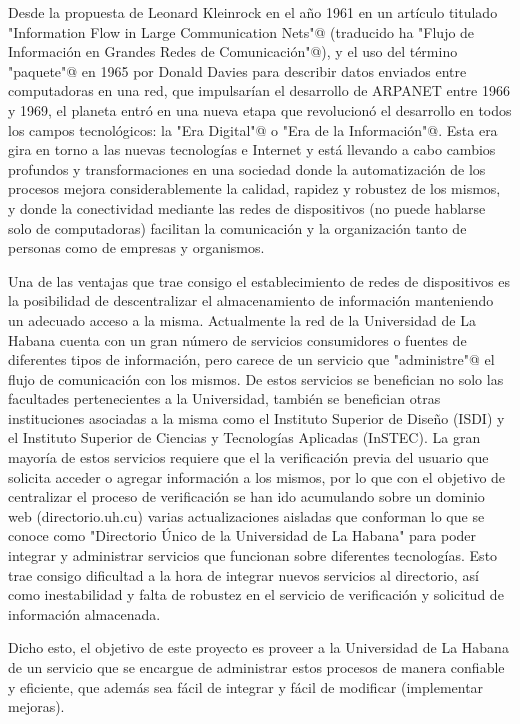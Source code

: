 \begin{introduction}
Desde la propuesta de Leonard Kleinrock en el año 1961 en un artículo titulado \verb@"Information Flow in Large Communication Nets"@ (traducido ha
\verb@"Flujo de Información en Grandes Redes de Comunicación"@), y el uso del término
\verb@"paquete"@ en 1965 por Donald Davies para describir datos enviados entre computadoras
en una red, que impulsarían el desarrollo de ARPANET entre 1966 y 1969, el planeta
entró en una nueva etapa que revolucionó el desarrollo en todos los campos 
tecnológicos: la \verb@"Era Digital"@ o \verb@"Era de la Información"@. Esta era gira
en torno a las nuevas tecnologías e Internet y está llevando a cabo cambios profundos y
transformaciones en una sociedad donde la automatización de los procesos mejora
considerablemente la calidad, rapidez y robustez de los mismos, y donde la conectividad
mediante las redes de dispositivos (no puede hablarse solo de computadoras) facilitan 
la comunicación y la organización tanto de personas como de empresas y organismos. 

Una de las ventajas que trae consigo el establecimiento de redes de dispositivos es
la posibilidad de descentralizar el almacenamiento de información manteniendo un adecuado acceso a la misma. Actualmente la red de la Universidad de La Habana cuenta con un gran número de servicios consumidores o fuentes de diferentes tipos de información, pero carece de un servicio que \verb@"administre"@ el flujo de comunicación con los mismos. De estos servicios se benefician no solo las facultades pertenecientes a la Universidad, también se benefician otras instituciones asociadas a la misma como el Instituto Superior de Diseño (ISDI) y el Instituto Superior de Ciencias y Tecnologías Aplicadas (InSTEC). La gran mayoría  de estos servicios requiere que el la verificación previa del usuario que solicita acceder o agregar información a los mismos, por lo que con el objetivo de centralizar el proceso de verificación se han ido acumulando sobre un dominio web (directorio.uh.cu) varias actualizaciones  aisladas que conforman lo que se conoce como "Directorio Único de la Universidad de La Habana" para poder integrar y administrar servicios que funcionan sobre diferentes tecnologías. Esto  trae consigo dificultad a la hora de integrar nuevos servicios al directorio, así como inestabilidad y falta de robustez en el servicio de verificación y solicitud de información almacenada.

Dicho esto, el objetivo de este proyecto es proveer a la Universidad de La Habana de un
servicio que se encargue de administrar estos procesos de manera confiable y eficiente,
que además sea fácil de integrar y fácil de modificar (implementar mejoras).


\end{introduction}

